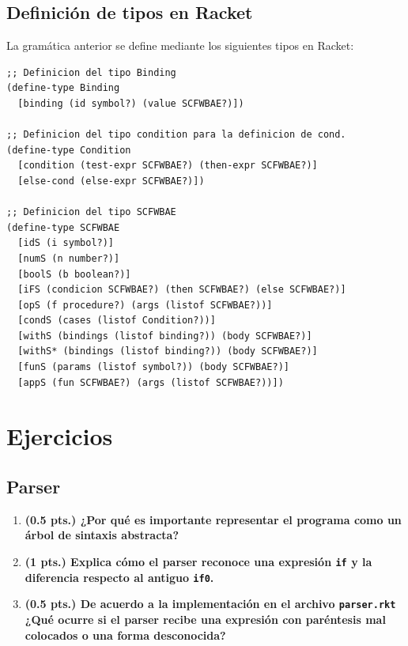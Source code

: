 \documentclass[12pt,letterpaper]{article}
\begin{document}
\subsection{Definición de tipos en Racket}

La gramática anterior se define mediante los siguientes tipos en Racket:

\begin{lstlisting}
;; Definicion del tipo Binding
(define-type Binding
  [binding (id symbol?) (value SCFWBAE?)])

;; Definicion del tipo condition para la definicion de cond.
(define-type Condition
  [condition (test-expr SCFWBAE?) (then-expr SCFWBAE?)]
  [else-cond (else-expr SCFWBAE?)])

;; Definicion del tipo SCFWBAE
(define-type SCFWBAE
  [idS (i symbol?)]
  [numS (n number?)]
  [boolS (b boolean?)]
  [iFS (condicion SCFWBAE?) (then SCFWBAE?) (else SCFWBAE?)]
  [opS (f procedure?) (args (listof SCFWBAE?))]
  [condS (cases (listof Condition?))]
  [withS (bindings (listof binding?)) (body SCFWBAE?)]
  [withS* (bindings (listof binding?)) (body SCFWBAE?)]
  [funS (params (listof symbol?)) (body SCFWBAE?)]
  [appS (fun SCFWBAE?) (args (listof SCFWBAE?))])
\end{lstlisting}

\newpage

\section{Ejercicios}

\subsection{Parser}

\begin{enumerate}

\item \textbf{(0.5 pts.) ¿Por qué es importante representar el programa como un árbol de sintaxis abstracta?}


\item \textbf{(1 pts.) Explica cómo el parser reconoce una expresión \texttt{if} y la diferencia respecto al antiguo \texttt{if0}.}

\item \textbf{(0.5 pts.) De acuerdo a la implementación en el archivo \texttt{parser.rkt} ¿Qué ocurre si el parser recibe una expresión con paréntesis mal colocados o una forma desconocida?}

\end{enumerate}
\end{document}
